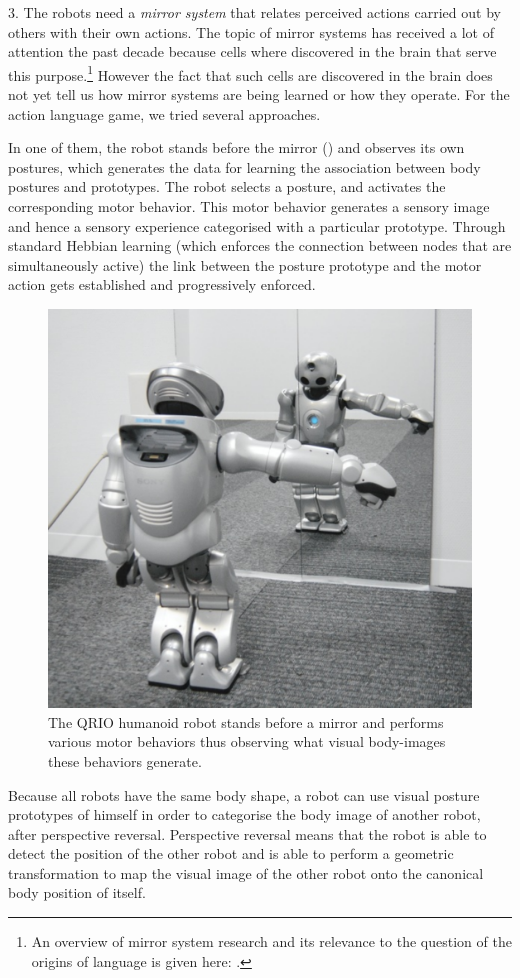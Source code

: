 3. The robots need a {\it mirror system} that relates perceived actions carried out by others with their own actions. 
The topic of mirror systems has received a lot of attention the past decade because cells where discovered in the brain 
that serve this purpose.\footnote{
An overview of mirror system research and its relevance to the question of the origins of language is given here: 
\cite{Rizzolatti:1998}.}
However the fact that such cells are discovered in the brain 
does not yet tell us how mirror systems are being learned or how they operate. For the action language game, we tried 
several approaches.

In one of them, the robot stands before the mirror () and observes its own 
postures, which generates the data for learning the association between body postures and prototypes. 
The robot selects a posture, and activates the corresponding motor behavior. This motor behavior generates a sensory image and 
hence a sensory experience categorised with a particular prototype. Through standard Hebbian learning (which enforces the 
connection between nodes that are simultaneously active) the link between the posture prototype and the motor action gets 
established and progressively enforced. 

\begin{figure}
\centerline{\includegraphics[width=0.6\linewidth]{chap11/figs/robot-mirror}}
\caption{\label{robot-mirror} \footnotesize{The QRIO humanoid robot stands before a mirror and performs various motor behaviors thus observing what visual body-images these behaviors generate.}}
\end{figure}

Because all robots have the same body shape, a robot can use visual posture prototypes of 
himself in order to categorise the body image of another robot, after 
perspective reversal. Perspective reversal means that the robot is able to detect the position of the other 
robot and is able to perform a geometric transformation to map the visual image of the other robot onto 
the canonical body position of itself.

